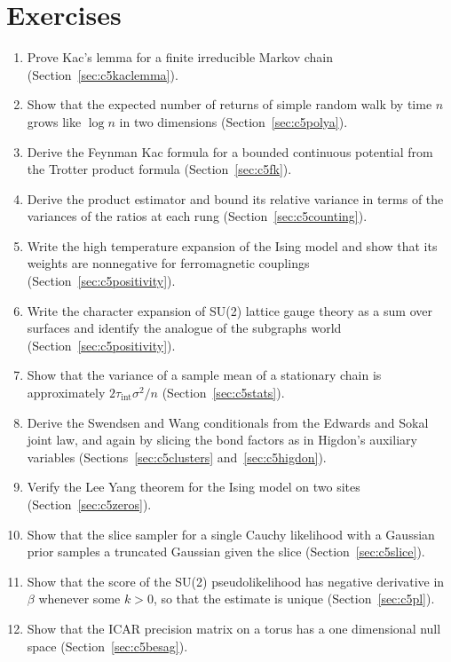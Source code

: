 \section*{Exercises}
\begin{enumerate}
\item Prove Kac's lemma for a finite irreducible Markov chain (Section~\ref{sec:c5kaclemma}).
\item Show that the expected number of returns of simple random walk by time $n$ grows like $\log n$ in two dimensions (Section~\ref{sec:c5polya}).
\item Derive the Feynman Kac formula for a bounded continuous potential from the Trotter product formula (Section~\ref{sec:c5fk}).
\item Derive the product estimator and bound its relative variance in terms of the variances of the ratios at each rung (Section~\ref{sec:c5counting}).
\item Write the high temperature expansion of the Ising model and show that its weights are nonnegative for ferromagnetic couplings (Section~\ref{sec:c5positivity}).
\item Write the character expansion of SU(2) lattice gauge theory as a sum over surfaces and identify the analogue of the subgraphs world (Section~\ref{sec:c5positivity}).
\item Show that the variance of a sample mean of a stationary chain is approximately $2\tau_{\mathrm{int}}\sigma^2/n$ (Section~\ref{sec:c5stats}).
\item Derive the Swendsen and Wang conditionals from the Edwards and Sokal joint law, and again by slicing the bond factors as in Higdon's auxiliary variables (Sections~\ref{sec:c5clusters} and~\ref{sec:c5higdon}).
\item Verify the Lee Yang theorem for the Ising model on two sites (Section~\ref{sec:c5zeros}).
\item Show that the slice sampler for a single Cauchy likelihood with a Gaussian prior samples a truncated Gaussian given the slice (Section~\ref{sec:c5slice}).
\item Show that the score of the SU(2) pseudolikelihood has negative derivative in $\beta$ whenever some $k>0$, so that the estimate is unique (Section~\ref{sec:c5pl}).
\item Show that the ICAR precision matrix on a torus has a one dimensional null space (Section~\ref{sec:c5besag}).
\end{enumerate}
